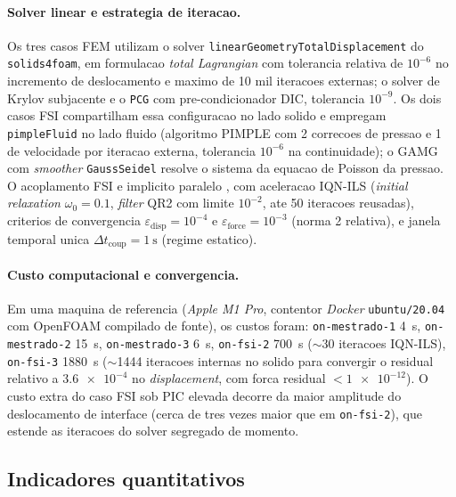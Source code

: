 \paragraph{Solver linear e estrategia de iteracao.} Os tres casos FEM utilizam o solver \texttt{linearGeometryTotalDisplacement} do \texttt{solids4foam}, em formulacao \emph{total Lagrangian} com tolerancia relativa de $10^{-6}$ no incremento de deslocamento e maximo de 10 mil iteracoes externas; o solver de Krylov subjacente e o \texttt{PCG} com pre-condicionador DIC, tolerancia $10^{-9}$. Os dois casos FSI compartilham essa configuracao no lado solido e empregam \texttt{pimpleFluid} no lado fluido (algoritmo PIMPLE com 2 correcoes de pressao e 1 de velocidade por iteracao externa, tolerancia $10^{-6}$ na continuidade); o GAMG com \emph{smoother} \texttt{GaussSeidel} resolve o sistema da equacao de Poisson da pressao. O acoplamento FSI e implicito paralelo \citep{Bungartz2016}, com aceleracao IQN-ILS (\emph{initial relaxation} $\omega_0 = 0.1$, \emph{filter} QR2 com limite $10^{-2}$, ate 50 iteracoes reusadas), criterios de convergencia $\varepsilon_{\mathrm{disp}} = 10^{-4}$ e $\varepsilon_{\mathrm{force}} = 10^{-3}$ (norma 2 relativa), e janela temporal unica $\Delta t_{\mathrm{coup}} = \SI{1}{\second}$ (regime estatico).

\paragraph{Custo computacional e convergencia.} Em uma maquina de referencia (\emph{Apple M1 Pro}, contentor \emph{Docker} \texttt{ubuntu/20.04} com OpenFOAM compilado de fonte), os custos foram: \texttt{on-mestrado-1} \SI{4}{\second}, \texttt{on-mestrado-2} \SI{15}{\second}, \texttt{on-mestrado-3} \SI{6}{\second}, \texttt{on-fsi-2} \SI{700}{\second} ($\sim$30 iteracoes IQN-ILS), \texttt{on-fsi-3} \SI{1880}{\second} ($\sim$\num{1444} iteracoes internas no solido para convergir o residual relativo a $\num{3.6e-4}$ no \emph{displacement}, com forca residual $< \num{1e-12}$). O custo extra do caso FSI sob PIC elevada decorre da maior amplitude do deslocamento de interface (cerca de tres vezes maior que em \texttt{on-fsi-2}), que estende as iteracoes do solver segregado de momento.

\subsection{Indicadores quantitativos}
\label{sec:resultados-indicadores}


